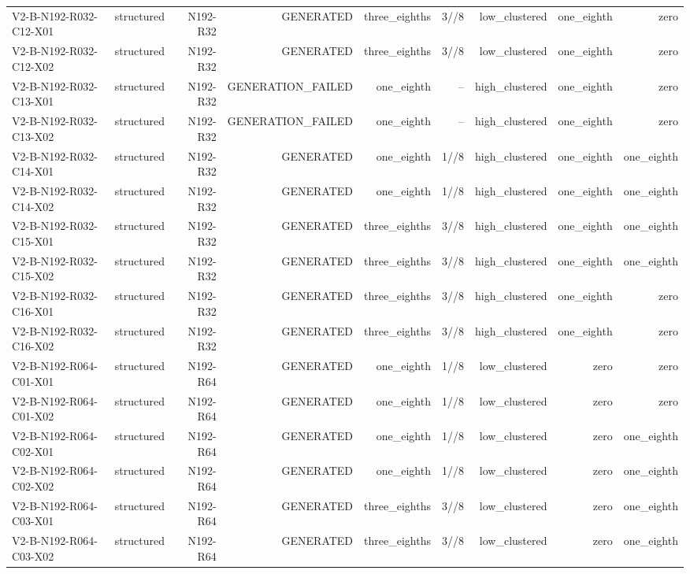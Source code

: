 {\begin{longtable}{lrrrrrrrr}
V2-B-N192-R032-C12-X01 & structured & N192-R32 & GENERATED & three\_eighths & 3//8 & low\_clustered & one\_eighth & zero \\
V2-B-N192-R032-C12-X02 & structured & N192-R32 & GENERATED & three\_eighths & 3//8 & low\_clustered & one\_eighth & zero \\
V2-B-N192-R032-C13-X01 & structured & N192-R32 & GENERATION\_FAILED & one\_eighth & -- & high\_clustered & one\_eighth & zero \\
V2-B-N192-R032-C13-X02 & structured & N192-R32 & GENERATION\_FAILED & one\_eighth & -- & high\_clustered & one\_eighth & zero \\
V2-B-N192-R032-C14-X01 & structured & N192-R32 & GENERATED & one\_eighth & 1//8 & high\_clustered & one\_eighth & one\_eighth \\
V2-B-N192-R032-C14-X02 & structured & N192-R32 & GENERATED & one\_eighth & 1//8 & high\_clustered & one\_eighth & one\_eighth \\
V2-B-N192-R032-C15-X01 & structured & N192-R32 & GENERATED & three\_eighths & 3//8 & high\_clustered & one\_eighth & one\_eighth \\
V2-B-N192-R032-C15-X02 & structured & N192-R32 & GENERATED & three\_eighths & 3//8 & high\_clustered & one\_eighth & one\_eighth \\
V2-B-N192-R032-C16-X01 & structured & N192-R32 & GENERATED & three\_eighths & 3//8 & high\_clustered & one\_eighth & zero \\
V2-B-N192-R032-C16-X02 & structured & N192-R32 & GENERATED & three\_eighths & 3//8 & high\_clustered & one\_eighth & zero \\
V2-B-N192-R064-C01-X01 & structured & N192-R64 & GENERATED & one\_eighth & 1//8 & low\_clustered & zero & zero \\
V2-B-N192-R064-C01-X02 & structured & N192-R64 & GENERATED & one\_eighth & 1//8 & low\_clustered & zero & zero \\
V2-B-N192-R064-C02-X01 & structured & N192-R64 & GENERATED & one\_eighth & 1//8 & low\_clustered & zero & one\_eighth \\
V2-B-N192-R064-C02-X02 & structured & N192-R64 & GENERATED & one\_eighth & 1//8 & low\_clustered & zero & one\_eighth \\
V2-B-N192-R064-C03-X01 & structured & N192-R64 & GENERATED & three\_eighths & 3//8 & low\_clustered & zero & one\_eighth \\
V2-B-N192-R064-C03-X02 & structured & N192-R64 & GENERATED & three\_eighths & 3//8 & low\_clustered & zero & one\_eighth \\

\end{longtable}}
